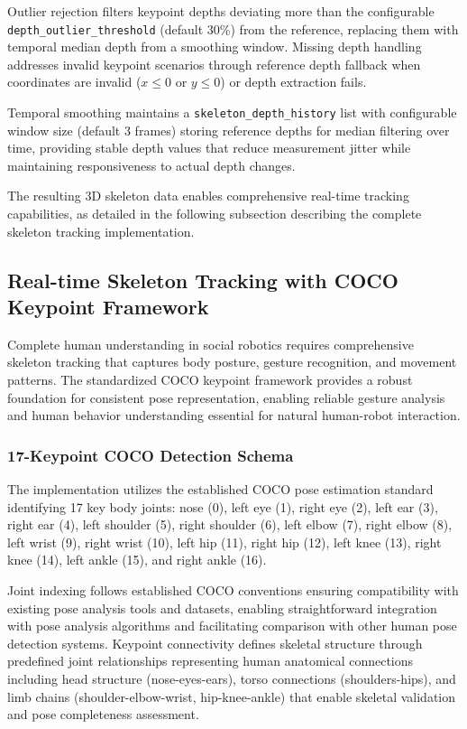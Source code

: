 Outlier rejection filters keypoint depths deviating more than the configurable \texttt{depth\_}\linebreak\texttt{outlier\_threshold} (default 30\%) from the reference, replacing them with temporal median depth from a smoothing window. Missing depth handling addresses invalid keypoint scenarios through reference depth fallback when coordinates are invalid ($x \leq 0$ or $y \leq 0$) or depth extraction fails.

Temporal smoothing maintains a \texttt{skeleton\_depth\_history} list with configurable window size (default 3 frames) storing reference depths for median filtering over time, providing stable depth values that reduce measurement jitter while maintaining responsiveness to actual depth changes.

The resulting 3D skeleton data enables comprehensive real-time tracking capabilities, as detailed in the following subsection describing the complete skeleton tracking implementation.



\subsection{Real-time Skeleton Tracking with COCO Keypoint Framework}

Complete human understanding in social robotics requires comprehensive skeleton tracking that captures body posture, gesture recognition, and movement patterns. The standardized COCO keypoint framework provides a robust foundation for consistent pose representation, enabling reliable gesture analysis and human behavior understanding essential for natural human-robot interaction.

\subsubsection{17-Keypoint COCO Detection Schema}

The implementation utilizes the established COCO pose estimation standard identifying 17 key body joints: nose (0), left eye (1), right eye (2), left ear (3), right ear (4), left shoulder (5), right shoulder (6), left elbow (7), right elbow (8), left wrist (9), right wrist (10), left hip (11), right hip (12), left knee (13), right knee (14), left ankle (15), and right ankle (16).

Joint indexing follows established COCO conventions ensuring compatibility with existing pose analysis tools and datasets, enabling straightforward integration with pose analysis algorithms and facilitating comparison with other human pose detection systems. Keypoint connectivity defines skeletal structure through predefined joint relationships representing human anatomical connections including head structure (nose-eyes-ears), torso connections (shoulders-hips), and limb chains (shoulder-elbow-wrist, hip-knee-ankle) that enable skeletal validation and pose completeness assessment.


